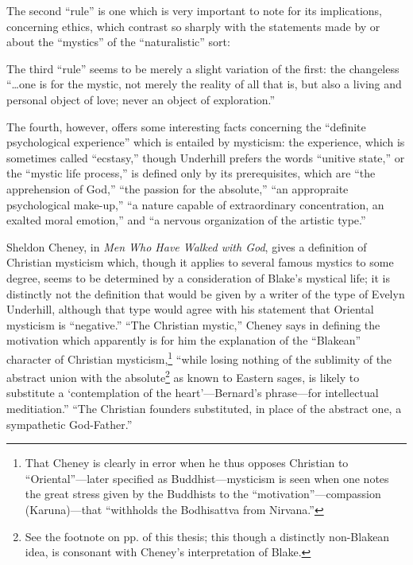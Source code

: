 The second \enquote{rule} is one which is very important to note
for its implications, concerning ethics, which contrast so
sharply with the statements made by or about the \enquote{mystics} of
the \enquote{naturalistic} sort:

\label{self:06}


The third \enquote{rule} seems to be merely a slight variation
of the first: the changeless \enquote{\dots one is for the mystic, not
merely the reality of all that is, but also a living and
personal object of love; never an object of exploration.}\supercite{underhill:mysticism}

The fourth, however, offers some interesting facts concerning
the \enquote{definite psychological experience} which is entailed
by mysticism: the experience, which is sometimes called
\enquote{ecstasy,} though Underhill prefers the words \enquote{unitive state,}
or the \enquote{mystic life process,} is defined only by its prerequisites,
which are \enquote{the apprehension of God,} \enquote{the passion
for the absolute,} \enquote{an appropraite psychological make-up,}
\enquote{a nature capable of extraordinary concentration, an exalted
moral emotion,} and \enquote{a nervous organization of the artistic type.}\supercite{underhill:mysticism}

Sheldon Cheney, in \emph{Men Who Have Walked with God},\supercite{cheney:walked-with-god}
gives a definition of Christian mysticism which, though it
applies to several famous mystics to some degree, seems to
be determined by a consideration of Blake's mystical life;
it is distinctly not the definition that would be given by
a writer of the type of Evelyn Underhill, although that
type would agree with his statement that Oriental mysticism
is \enquote{negative.} \enquote{The Christian mystic,} Cheney says in defining
the motivation which apparently is for him the explanation
of the \enquote{Blakean} character of Christian mysticism,\footnote{That Cheney is clearly in error when he thus opposes Christian to \enquote{Oriental}---later specified as Buddhist---mysticism is seen when one notes the great stress given by the Buddhists to the \enquote{motivation}---compassion (Karuna)---that \enquote{withholds the Bodhisattva from Nirvana.}\supercite{heinrich:philosophies-india}}
\enquote{while losing nothing of the sublimity of the abstract union with the absolute\footnote{See the footnote on pp. \pageref{self:08} of this thesis; this though a distinctly non-Blakean idea, is consonant with Cheney's interpretation of Blake.}
as known to Eastern sages, is likely to substitute a \enquote*{contemplation of the heart}---Bernard's phrase---for
intellectual meditiation.}\supercite{cheney:walked-with-god}
\enquote{The Christian founders substituted, in place of the abstract one, a sympathetic God-Father.}\supercite{cheney:walked-with-god}

